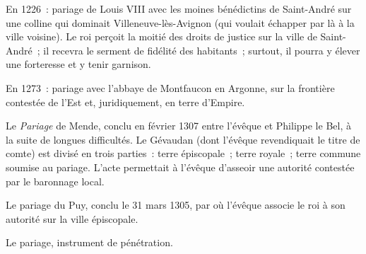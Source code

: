 \documentclass[french,twoside]{book} %
\begin{document}
En 1226 : pariage de Louis VIII avec les moines bénédictins de  
\label{p21} Saint-André sur une colline qui dominait Villeneuve-lès-Avignon (qui voulait échapper par là à la ville voisine). Le roi perçoit la moitié des droits de justice sur la ville de Saint-André ; il recevra le serment de fidélité des habitants ; surtout, il pourra y élever une forteresse et y tenir garnison.\par
En 1273 : pariage avec l’abbaye de Montfaucon en Argonne, sur la frontière contestée de l’Est et, juridiquement, en terre d’Empire.\par
Le \emph{Pariage} de Mende, conclu en février 1307 entre l’évêque et Philippe le Bel, à la suite de longues difficultés. Le Gévaudan (dont l’évêque revendiquait le titre de comte) est divisé en trois parties : terre épiscopale ; terre royale ; terre commune soumise au pariage. L’acte permettait à l’évêque d’asseoir une autorité contestée par le baronnage local.\par
Le pariage du Puy, conclu le 31 mars 1305, par où l’évêque associe le roi à son autorité sur la ville épiscopale.\par
Le pariage, instrument de pénétration.
\end{document}

